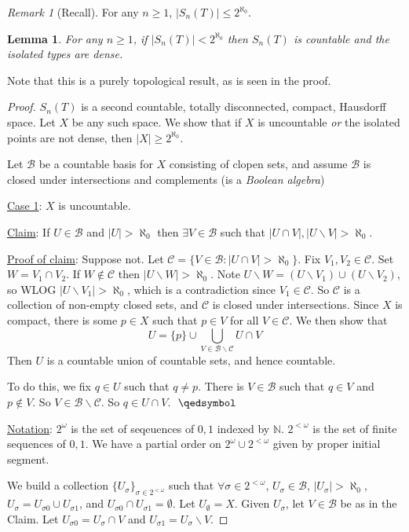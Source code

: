 \documentclass[]{article}
\theoremstyle{custhm}
\theoremstyle{cusdef}
\theoremstyle{custhm}
\newtheorem{lemma}[theorem]{Lemma}
\theoremstyle{custhm}
\theoremstyle{custhm}
\theoremstyle{ex}
\theoremstyle{custhm}
\theoremstyle{cusdef}
\theoremstyle{remark}
\newtheorem*{remark*}{Remark}
\theoremstyle{remark}
\theoremstyle{numremark}
\renewcommand{\it}[1]{\textit{#1}}
\begin{document}
\begin{remark*}[Recall]
For any $n\ge1$, $|S_n(T)|\le 2^{\aleph_0}$.
\end{remark*}
\begin{lemma}
	For any $n\ge 1$, if $|S_n(T)| < 2^{\aleph_0}$ then $S_n(T)$ is countable and the isolated types are dense.
\end{lemma}
Note that this is a purely topological result, as is seen in the proof.
\begin{proof}
	$S_n(T)$ is a second countable, totally disconnected, compact, Hausdorff space. Let $X$ be any such space. We show that if $X$ is uncountable \it{or} the isolated points are not dense, then $|X| \ge 2^{\aleph_0}$.

	Let $\mathcal{B}$ be a countable basis for $X$ consisting of clopen sets, and assume $\mathcal{B}$ is closed under intersections and complements (is a \it{Boolean algebra})

	\underline{Case 1}: $X$ is uncountable.

	\underline{Claim}: If $U\in \mathcal{B}$ and $|U| > \aleph_0$ then $\exists V\in \mathcal{B}$ such that $|U\cap V|,|U\backslash V| > \aleph_0$.
	
	\underline{Proof of claim}: Suppose not. Let $\mathcal{C} = \{V\in \mathcal{B}:|U\cap V| > \aleph_0\}$. Fix $V_1,V_2\in \mathcal{C}$. Set $W = V_1\cap V_2$. If $W\not\in \mathcal{C}$ then $|U\backslash W| > \aleph_0$. Note $U\backslash W = (U\backslash V_1)\cup(U\backslash V_2)$, so WLOG $|U\backslash V_1| > \aleph_0$, which is a contradiction since $V_1\in \mathcal{C}$. So $\mathcal{C}$ is a collection of non-empty closed sets, and $\mathcal{C}$ is closed under intersections. Since $X$ is compact, there is some $p \in X$ such that $p \in V$ for all $V \in \mathcal{C}$. We then show that $$U = \{p\}\cup\bigcup_{V\in \mathcal{B}\backslash\mathcal{C}}U\cap V$$
	Then $U$ is a countable union of countable sets, and hence countable.

	To do this, we fix $q \in U$ such that $q \ne p$. There is $V\in \mathcal{B}$ such that $q \in V$ and $p \not \in V$. So $V \in \mathcal{B}\backslash \mathcal{C}$. So $q \in U\cap V$.$\ \  \qedsymbol$

	\underline{Notation}: $2^\omega$ is the set of seqeuences of $0,1$ indexed by $\mathbb{N}$. $2^{<\omega}$ is the set of finite sequences of $0,1$. We have a partial order on $2^\omega \cup 2^{<\omega}$ given by proper initial segment.

	We build a collection $\{U_\sigma\}_{\sigma\in 2^{<\omega}}$ such that $\forall \sigma \in 2^{<\omega}$, $U_\sigma \in \mathcal{B}$, $|U_{\sigma}| > \aleph_0$, $U_{\sigma} = U_{\sigma 0}\cup U_{\sigma 1}$, and $U_{\sigma0}\cap U_{\sigma1} = \emptyset$. Let $U_{\emptyset} = X$. Given $U_\sigma$, let $V \in \mathcal{B}$ be as in the Claim. Let $U_{\sigma 0} =  U_\sigma \cap V$ and $U_{\sigma 1} = U_\sigma\backslash V$.


\end{proof}
\end{document}
